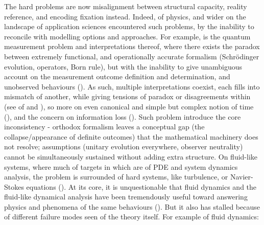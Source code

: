 The hard problems are now misalignment between structural capacity, reality reference, and encoding fixation instead. Indeed, of physics, and wider on the landscape of application sciences encountered such problems, by the inability to reconcile with modelling options and approaches. For example, is the quantum measurement problem and interpretations thereof, where there exists the paradox between extremely functional, and operationally accurate formalism (Schrödinger evolution, operators, Born rule), but with the inability to give unambiguous account on the measurement outcome definition and determination, and unobserved behaviours (\cite{Zurek2009,Zurek2018,Pusey_2012}). As such, multiple interpretations coexist, each fills into mismatch of another, while giving tensions of paradox or disagreements within (see of \cite{Zurek2003,vonNeumann1955,Pusey_2012,Bell1964,Everett1957} and \cite{Schlosshauer2004}), so more on even canonical and simple but complex notion of time (\cite{Altaie2022}), and the concern on information loss (\cite{Unruh_2017}). Such problem introduce the core inconsistency - orthodox formalism leaves a conceptual gap (the collapse/appearance of definite outcomes) that the mathematical machinery does not resolve; assumptions (unitary evolution everywhere, observer neutrality) cannot be simultaneously sustained without adding extra structure. On fluid-like systems, where much of targets in which are of PDE and system dynamics analysis, the problem is surrounded of hard systems, like turbulence, or Navier-Stokes equations (\cite{navier1822mouvement,navier1823mouvement,stokes1845internal,leray1934weak,darrigol2002five,bistafa2023navierstokes200,batchelor1967fluid,anderson1995history}). At its core, it is unquestionable that fluid dynamics and the fluid-like dynamical analysis have been tremendously useful toward answering physics and phenomena of the same behaviours (\cite{NSMillenniumProblemWikipedia}). But it also has stalled because of different failure modes seen of the theory itself. For example of fluid dynamics: 
